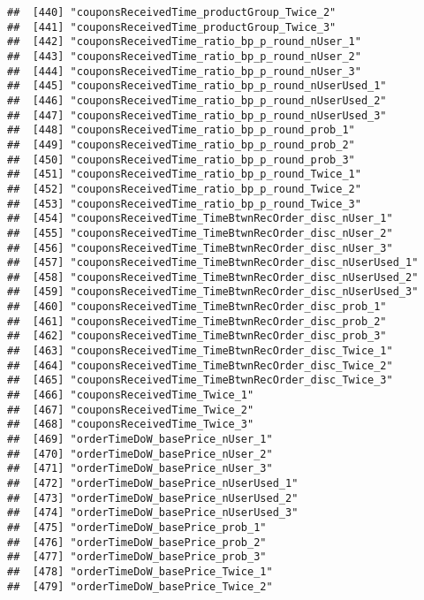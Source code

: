 \documentclass[10pt]{report}
\begin{document}
\begin{verbatim}
##  [440] "couponsReceivedTime_productGroup_Twice_2"             
##  [441] "couponsReceivedTime_productGroup_Twice_3"             
##  [442] "couponsReceivedTime_ratio_bp_p_round_nUser_1"         
##  [443] "couponsReceivedTime_ratio_bp_p_round_nUser_2"         
##  [444] "couponsReceivedTime_ratio_bp_p_round_nUser_3"         
##  [445] "couponsReceivedTime_ratio_bp_p_round_nUserUsed_1"     
##  [446] "couponsReceivedTime_ratio_bp_p_round_nUserUsed_2"     
##  [447] "couponsReceivedTime_ratio_bp_p_round_nUserUsed_3"     
##  [448] "couponsReceivedTime_ratio_bp_p_round_prob_1"          
##  [449] "couponsReceivedTime_ratio_bp_p_round_prob_2"          
##  [450] "couponsReceivedTime_ratio_bp_p_round_prob_3"          
##  [451] "couponsReceivedTime_ratio_bp_p_round_Twice_1"         
##  [452] "couponsReceivedTime_ratio_bp_p_round_Twice_2"         
##  [453] "couponsReceivedTime_ratio_bp_p_round_Twice_3"         
##  [454] "couponsReceivedTime_TimeBtwnRecOrder_disc_nUser_1"    
##  [455] "couponsReceivedTime_TimeBtwnRecOrder_disc_nUser_2"    
##  [456] "couponsReceivedTime_TimeBtwnRecOrder_disc_nUser_3"    
##  [457] "couponsReceivedTime_TimeBtwnRecOrder_disc_nUserUsed_1"
##  [458] "couponsReceivedTime_TimeBtwnRecOrder_disc_nUserUsed_2"
##  [459] "couponsReceivedTime_TimeBtwnRecOrder_disc_nUserUsed_3"
##  [460] "couponsReceivedTime_TimeBtwnRecOrder_disc_prob_1"     
##  [461] "couponsReceivedTime_TimeBtwnRecOrder_disc_prob_2"     
##  [462] "couponsReceivedTime_TimeBtwnRecOrder_disc_prob_3"     
##  [463] "couponsReceivedTime_TimeBtwnRecOrder_disc_Twice_1"    
##  [464] "couponsReceivedTime_TimeBtwnRecOrder_disc_Twice_2"    
##  [465] "couponsReceivedTime_TimeBtwnRecOrder_disc_Twice_3"    
##  [466] "couponsReceivedTime_Twice_1"                          
##  [467] "couponsReceivedTime_Twice_2"                          
##  [468] "couponsReceivedTime_Twice_3"                          
##  [469] "orderTimeDoW_basePrice_nUser_1"                       
##  [470] "orderTimeDoW_basePrice_nUser_2"                       
##  [471] "orderTimeDoW_basePrice_nUser_3"                       
##  [472] "orderTimeDoW_basePrice_nUserUsed_1"                   
##  [473] "orderTimeDoW_basePrice_nUserUsed_2"                   
##  [474] "orderTimeDoW_basePrice_nUserUsed_3"                   
##  [475] "orderTimeDoW_basePrice_prob_1"                        
##  [476] "orderTimeDoW_basePrice_prob_2"                        
##  [477] "orderTimeDoW_basePrice_prob_3"                        
##  [478] "orderTimeDoW_basePrice_Twice_1"                       
##  [479] "orderTimeDoW_basePrice_Twice_2"                       

\end{verbatim}
\end{document}
